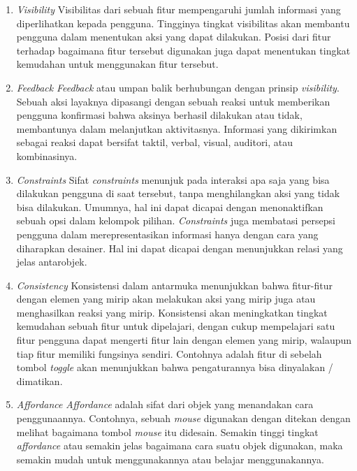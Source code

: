 \newpage

\begin{enumerate}
  \item \textit{Visibility}
  \subitem Visibilitas dari sebuah fitur mempengaruhi jumlah informasi yang diperlihatkan kepada pengguna. Tingginya tingkat visibilitas akan membantu pengguna dalam menentukan aksi yang dapat dilakukan. Posisi dari fitur terhadap bagaimana fitur tersebut digunakan juga dapat menentukan tingkat kemudahan untuk menggunakan fitur tersebut.
   
  \item \textit{Feedback}
  \subitem \textit{Feedback} atau umpan balik berhubungan dengan prinsip \textit{visibility}. Sebuah aksi layaknya dipasangi dengan sebuah reaksi untuk memberikan pengguna konfirmasi bahwa aksinya berhasil dilakukan atau tidak, membantunya dalam melanjutkan aktivitasnya. Informasi yang dikirimkan sebagai reaksi dapat bersifat taktil, verbal, visual, auditori, atau kombinasinya.
   
  \item \textit{Constraints}
  \subitem Sifat \textit{constraints} menunjuk pada interaksi apa saja yang bisa dilakukan pengguna di saat tersebut, tanpa menghilangkan aksi yang tidak bisa dilakukan. Umumnya, hal ini dapat dicapai dengan menonaktifkan sebuah opsi dalam kelompok pilihan. \textit{Constraints} juga membatasi persepsi pengguna dalam merepresentasikan informasi hanya dengan cara yang diharapkan desainer. Hal ini dapat dicapai dengan menunjukkan relasi yang jelas antarobjek.
   
  \item \textit{Consistency}
  \subitem Konsistensi dalam antarmuka menunjukkan bahwa fitur-fitur dengan elemen yang mirip akan melakukan aksi yang mirip juga atau menghasilkan reaksi yang mirip. Konsistensi akan meningkatkan tingkat kemudahan sebuah fitur untuk dipelajari, dengan cukup mempelajari satu fitur pengguna dapat mengerti fitur lain dengan elemen yang mirip, walaupun tiap fitur memiliki fungsinya sendiri. Contohnya adalah fitur di sebelah tombol \textit{toggle} akan menunjukkan bahwa pengaturannya bisa dinyalakan / dimatikan.
   
  \item \textit{Affordance}
  \subitem \textit{Affordance} adalah sifat dari objek yang menandakan cara penggunaannya. Contohnya, sebuah \textit{mouse} digunakan dengan ditekan dengan melihat bagaimana tombol \textit{mouse} itu didesain. Semakin tinggi tingkat \textit{affordance} atau semakin jelas bagaimana cara suatu objek digunakan, maka semakin mudah untuk menggunakannya atau belajar menggunakannya.
   
\end{enumerate}

